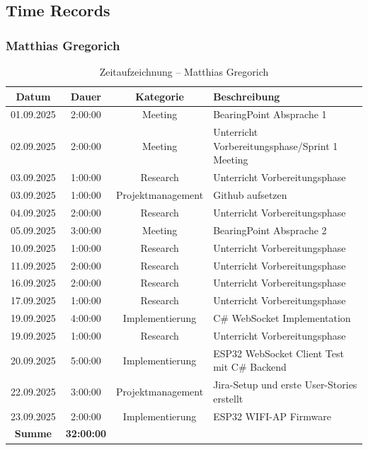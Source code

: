 \documentclass{article}
\begin{document}
\subsection{Time Records}

\subsubsection*{Matthias Gregorich}
\begin{table}[H]
  \centering
  \begin{tabularx}{\textwidth}{|c|c|c|X|}
    \hline
    \rowcolor{black!10}\textbf{Datum} & \textbf{Dauer} & \textbf{Kategorie} & \textbf{Beschreibung} \\
    \hline
    01.09.2025 & 2:00:00 & Meeting           & BearingPoint Absprache 1 \\ \hline
    02.09.2025 & 2:00:00 & Meeting           & Unterricht Vorbereitungsphase/Sprint 1 Meeting \\ \hline
    03.09.2025 & 1:00:00 & Research          & Unterricht Vorbereitungsphase \\ \hline
    03.09.2025 & 1:00:00 & Projektmanagement & Github aufsetzen \\ \hline
    04.09.2025 & 2:00:00 & Research          & Unterricht Vorbereitungsphase \\ \hline
    05.09.2025 & 3:00:00 & Meeting           & BearingPoint Absprache 2 \\ \hline
    10.09.2025 & 1:00:00 & Research          & Unterricht Vorbereitungsphase \\ \hline
    11.09.2025 & 2:00:00 & Research          & Unterricht Vorbereitungsphase \\ \hline
    16.09.2025 & 2:00:00 & Research          & Unterricht Vorbereitungsphase \\ \hline
    17.09.2025 & 1:00:00 & Research          & Unterricht Vorbereitungsphase \\ \hline
    19.09.2025 & 4:00:00 & Implementierung   & C\# WebSocket Implementation \\ \hline
    19.09.2025 & 1:00:00 & Research          & Unterricht Vorbereitungsphase \\ \hline
    20.09.2025 & 5:00:00 & Implementierung   & ESP32 WebSocket Client Test mit C\# Backend \\ \hline
    22.09.2025 & 3:00:00 & Projektmanagement & Jira-Setup und erste User-Stories erstellt \\ \hline
    23.09.2025 & 2:00:00 & Implementierung   & ESP32 WIFI-AP Firmware \\ \hline
    \rowcolor{black!10}\textbf{Summe} & \textbf{32:00:00} & & \\ \hline
  \end{tabularx}
  \caption{Zeitaufzeichnung – Matthias Gregorich}
  \label{tab:zeit-matthias}
\end{table}
\end{document}
